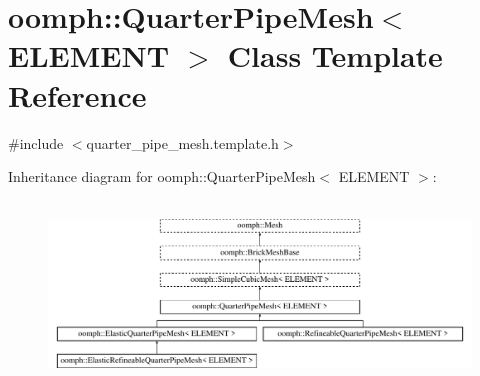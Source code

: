 \hypertarget{classoomph_1_1QuarterPipeMesh}{}\section{oomph\+:\+:Quarter\+Pipe\+Mesh$<$ E\+L\+E\+M\+E\+NT $>$ Class Template Reference}
\label{classoomph_1_1QuarterPipeMesh}


{\ttfamily \#include $<$quarter\+\_\+pipe\+\_\+mesh.\+template.\+h$>$}

Inheritance diagram for oomph\+:\+:Quarter\+Pipe\+Mesh$<$ E\+L\+E\+M\+E\+NT $>$\+:\begin{figure}[H]
\begin{center}
\leavevmode
\includegraphics[height=4.912281cm]{classoomph_1_1QuarterPipeMesh}
\end{center}
\end{figure}
